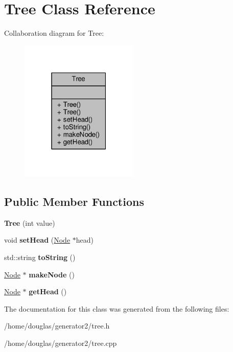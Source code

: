 \hypertarget{classTree}{}\section{Tree Class Reference}
\label{classTree}


Collaboration diagram for Tree\+:
\nopagebreak
\begin{figure}[H]
\begin{center}
\leavevmode
\includegraphics[width=159pt]{classTree__coll__graph}
\end{center}
\end{figure}
\subsection*{Public Member Functions}
\begin{DoxyCompactItemize}
\item 
{\bfseries Tree} (int value)\hypertarget{classTree_a2068d6ddb603a69ee8a2976f82484418}{}\label{classTree_a2068d6ddb603a69ee8a2976f82484418}

\item 
void {\bfseries set\+Head} (\hyperlink{classNode}{Node} $\ast$head)\hypertarget{classTree_a7c5433dae85048c5dd6851a60aed0687}{}\label{classTree_a7c5433dae85048c5dd6851a60aed0687}

\item 
std\+::string {\bfseries to\+String} ()\hypertarget{classTree_a76777bde24db9b08189070447705edf0}{}\label{classTree_a76777bde24db9b08189070447705edf0}

\item 
\hyperlink{classNode}{Node} $\ast$ {\bfseries make\+Node} ()\hypertarget{classTree_aa419af982fdbd7f4fa51ded766021d13}{}\label{classTree_aa419af982fdbd7f4fa51ded766021d13}

\item 
\hyperlink{classNode}{Node} $\ast$ {\bfseries get\+Head} ()\hypertarget{classTree_a7ab8f60625a239abe00480f2d3e59750}{}\label{classTree_a7ab8f60625a239abe00480f2d3e59750}

\end{DoxyCompactItemize}


The documentation for this class was generated from the following files\+:\begin{DoxyCompactItemize}
\item 
/home/douglas/generator2/tree.\+h\item 
/home/douglas/generator2/tree.\+cpp\end{DoxyCompactItemize}
